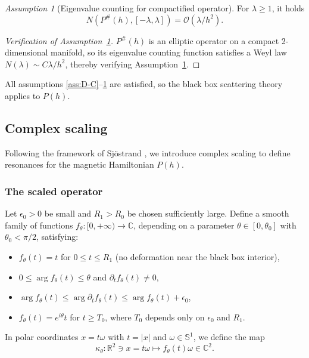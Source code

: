 \documentclass[11pt]{amsart}
\theoremstyle{remark}
\newtheorem{assumption}[theorem]{Assumption}
\numberwithin{equation}{section}
\begin{document}
\begin{assumption}[Eigenvalue counting for compactified operator]\label{Ass:Weyl}
For $\lambda \geq 1$, it holds
\[
N(P^{\#}(h), [-\lambda, \lambda]) = \mathcal{O}(\lambda/h^2).
\]
%
\end{assumption}

\begin{proof}[Verification of Assumption~\ref{Ass:Weyl}]
$P^{\#}(h)$ is an elliptic operator on a compact 2-dimensional manifold, so its eigenvalue counting function satisfies a Weyl law $N(\lambda) \sim C\lambda/h^2$, thereby verifying Assumption~\ref{Ass:Weyl}.\medskip
\end{proof}

All assumptions \ref{ass:D-C}--\ref{Ass:Weyl} are satisfied, so the black box scattering theory applies to $P(h)$.

\subsection{Complex scaling}\label{sec:complex scaling}


Following the framework of Sj\"ostrand \cite[Section 5]{S}, we introduce complex scaling to define resonances for the magnetic Hamiltonian $P(h)$. 

\subsubsection{The scaled operator}

Let $\epsilon_0 > 0$ be small and $R_1 > R_0$ be chosen sufficiently large. Define a smooth family of functions $f_\theta: [0,+\infty) \to \mathbb{C}$, depending on a parameter $\theta \in [0,\theta_0]$ with $\theta_0 < \pi/2$, satisfying:

\begin{itemize}
    \item[(i)] $f_\theta(t) = t$ for $0 \le t \le R_1$ (no deformation near the black box interior),
    \item[(ii)] $0 \le \arg f_\theta(t) \le \theta$ and $\partial_t f_\theta(t) \neq 0$,
    \item[(iii)] $\arg f_\theta(t) \le \arg \partial_t f_\theta(t) \le \arg f_\theta(t) + \epsilon_0$,
    \item[(iv)] $f_\theta(t) = e^{i\theta} t$ for $t \ge T_0$, where $T_0$ depends only on $\epsilon_0$ and $R_1$.
\end{itemize}

In polar coordinates $x = t\omega$ with $t = |x|$ and $\omega \in \mathbb S^1$, we define the map
\[
\kappa_\theta: \mathbb{R}^2 \ni x = t\omega \mapsto f_\theta(t)\omega \in \mathbb{C}^2.
\]
\end{document}

